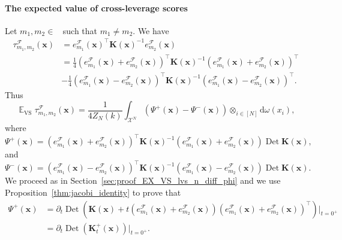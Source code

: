 \documentclass[twoside,11pt]{book}
\DeclareMathOperator{\Det}{Det}
\DeclareMathOperator{\VS}{\mathrm{VS}}
\DeclareMathOperator{\Tran}{\intercal}
\DeclareMathOperator{\EX}{\mathbb{E}}
\DeclareMathOperator{\F}{\mathcal{F}}
\DeclareMathOperator{\Ns}{\mathbb{N}^{*}}
\newcommand{\rb}[1]{\textcolor{magenta}{#1}}
\begin{document}
\paragraph{The expected value of cross-leverage scores}
Let $m_{1},m_{2} \in \Ns$ such that $m_{1} \neq m_{2}$. We have
\begin{align}
\tau_{m_{1},m_{2}}^{\F}(\bm{x}) & = e_{m_{1}}^{\mathcal{F}}(\bm{x})^{\Tran}\bm{K}(\bm{x})^{-1}e_{m_{2}}^{\mathcal{F}}(\bm{x}) \nonumber \\
& = \frac{1}{4} \left(e_{m_{1}}^{\mathcal{F}}(\bm{x}) + e_{m_{2}}^{\mathcal{F}}(\bm{x})\right)^{\Tran}\bm{K}(\bm{x})^{-1}\left(e_{m_{1}}^{\mathcal{F}}(\bm{x}) + e_{m_{2}}^{\mathcal{F}}(\bm{x})\right)^{\Tran}  \nonumber \\
& - \frac{1}{4} \left(e_{m_{1}}^{\mathcal{F}}(\bm{x}) - e_{m_{2}}^{\mathcal{F}}(\bm{x})\right)^{\Tran}\bm{K}(\bm{x})^{-1}\left(e_{m_{1}}^{\mathcal{F}}(\bm{x}) - e_{m_{2}}^{\mathcal{F}}(\bm{x})\right)^{\Tran}.
\end{align}
Thus
\begin{equation}
\EX_{\VS} \tau_{m_{1},m_{2}}^{\F}(\bm{x}) = \frac{1}{4 Z_{N}(k)}\int_{\mathcal{X}^{N}} \left( \Psi^{+}(\bm{x}) - \Psi^{-}(\bm{x}) \right) \otimes_{i \in [N]}\mathrm{d}\omega(x_{i}),
\end{equation}
where
\begin{equation}
\Psi^{+}(\bm{x}) = \left(e_{m_{1}}^{\mathcal{F}}(\bm{x})+e_{m_{2}}^{\mathcal{F}}(\bm{x})\right)^{\Tran}\bm{K}(\bm{x})^{-1}\left(e_{m_{1}}^{\mathcal{F}}(\bm{x})+e_{m_{2}}^{\mathcal{F}}(\bm{x})\right) \Det \bm{K}(\bm{x}),
\end{equation}
and
\begin{equation}
\Psi^{-}(\bm{x}) = \left(e_{m_{1}}^{\mathcal{F}}(\bm{x})-e_{m_{2}}^{\mathcal{F}}(\bm{x})\right)^{\Tran}\bm{K}(\bm{x})^{-1}\left(e_{m_{1}}^{\mathcal{F}}(\bm{x})-e_{m_{2}}^{\mathcal{F}}(\bm{x})\right) \Det \bm{K}(\bm{x}).
\end{equation}
We proceed as in Section~\ref{sec:proof_EX_VS_lvs_n_diff_phi} and we use Proposition~\ref{thm:jacobi_identity} to prove that
\begin{align}
\Psi^{+}(\bm{x}) & = \partial_{t} \Det \left(\bm{K}(\bm{x})+t \left(e_{m_{1}}^{\mathcal{F}}(\bm{x}) + e_{m_{2}}^{\mathcal{F}}(\bm{x}) \right)\left(e_{m_{1}}^{\mathcal{F}}(\bm{x}) + e_{m_{2}}^{\mathcal{F}}(\bm{x}) \right)^{\Tran}\right)|_{t = 0^{+}} \nonumber \\
& = \partial_{t} \Det \left(\bm{K}_{t}^{+}(\bm{x})\right)|_{t = 0^{+}}.
\end{align}
\end{document}
